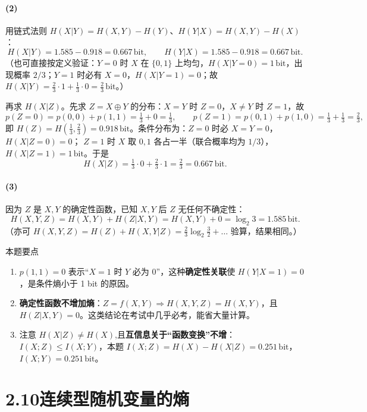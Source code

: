 \documentclass[11pt,a4paper]{ctexart}
\newcommand{\Hx}[1]{H\!\left(#1\right)}
\newcommand{\I}[1]{I\!\left(#1\right)}
\newcommand{\lb}{\log_{2}}
\newcommand{\bit}{\,\text{bit}}
\begin{document}
\paragraph{(2)} 用链式法则 $\Hx{X|Y}=\Hx{X,Y}-\Hx{Y}$、$\Hx{Y|X}=\Hx{X,Y}-\Hx{X}$：
\[
\Hx{X|Y}=1.585-0.918=0.667\bit,\qquad
\Hx{Y|X}=1.585-0.918=0.667\bit.
\]
（也可直接按定义验证：$Y=0$ 时 $X$ 在 $\{0,1\}$ 上均匀，$\Hx{X|Y=0}=1\bit$，出现概率 $2/3$；$Y=1$ 时必有 $X=0$，$\Hx{X|Y=1}=0$；故 $\Hx{X|Y}=\tfrac23\cdot 1+\tfrac13\cdot 0=\tfrac23\bit$。）

再求 $\Hx{X|Z}$。先求 $Z=X\oplus Y$ 的分布：$X=Y$ 时 $Z=0$，$X\neq Y$ 时 $Z=1$，故
\[
p(Z=0)=p(0,0)+p(1,1)=\tfrac13+0=\tfrac13,\qquad
p(Z=1)=p(0,1)+p(1,0)=\tfrac13+\tfrac13=\tfrac23,
\]
即 $\Hx{Z}=\Hx{\tfrac13,\tfrac23}=0.918\bit$。条件分布为：$Z=0$ 时必 $X=Y=0$，$\Hx{X|Z=0}=0$；
$Z=1$ 时 $X$ 取 $0,1$ 各占一半（联合概率均为 $1/3$），$\Hx{X|Z=1}=1\bit$。于是
\[
\boxed{\Hx{X|Z}=\tfrac13\cdot 0+\tfrac23\cdot 1=\tfrac23=0.667\bit } .
\]

\paragraph{(3)} 因为 $Z$ 是 $X,Y$ 的确定性函数，已知 $X,Y$ 后 $Z$ 无任何不确定性：
\[
\Hx{X,Y,Z}=\Hx{X,Y}+\Hx{Z|X,Y}=\Hx{X,Y}+0=\lb3=1.585\bit .
\]
（亦可 $\Hx{X,Y,Z}=\Hx{Z}+\Hx{X,Y|Z}=\tfrac23\lb\tfrac32+\dots$ 验算，结果相同。）

\begin{keypoint}{本题要点}
\begin{enumerate}[leftmargin=1.6em,itemsep=1pt,topsep=2pt]
  \item $p(1,1)=0$ 表示“$X=1$ 时 $Y$ 必为 0”，这种\textbf{确定性关联}使 $\Hx{Y|X=1}=0$，是条件熵小于 1 bit 的原因。
  \item \textbf{确定性函数不增加熵}：$Z=f(X,Y)\Rightarrow \Hx{X,Y,Z}=\Hx{X,Y}$，且 $\Hx{Z|X,Y}=0$。这类结论在考试中几乎必考，能省大量计算。
  \item 注意 $\Hx{X|Z}\neq \Hx{X}$,且\textbf{互信息关于“函数变换”不增}：$\I{X;Z}\le\I{X;Y}$，本题 $\I{X;Z}=\Hx{X}-\Hx{X|Z}=0.251\bit$，$\I{X;Y}=0.251\bit$。
\end{enumerate}
\end{keypoint}

\section*{2.10\quad 连续型随机变量的熵}
\end{document}
